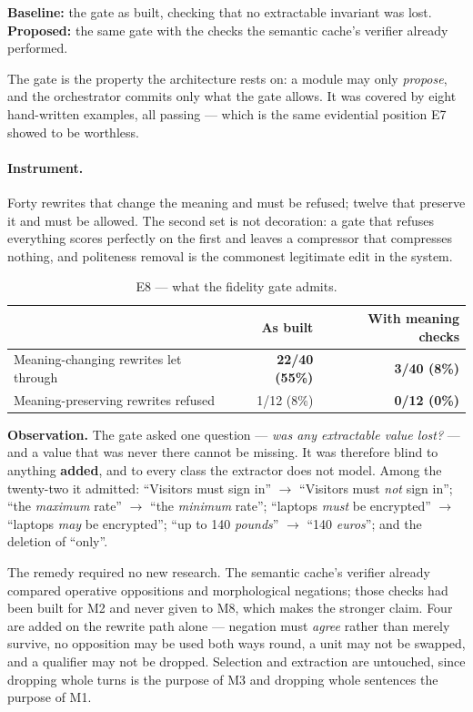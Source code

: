 \documentclass[11pt,a4paper]{article}
\newcommand{\obs}[1]{%
  \par\vspace{2pt}
  \noindent\begin{tcolorbox}[colback=soft,colframe=accent,boxrule=0pt,
    leftrule=2.2pt,arc=0pt,left=7pt,right=5pt,top=4pt,bottom=4pt,breakable]
  \small\textbf{Observation.} #1
  \end{tcolorbox}\par\vspace{2pt}}
\begin{document}
\textbf{Baseline:} the gate as built, checking that no extractable invariant was
lost. \textbf{Proposed:} the same gate with the checks the semantic cache's
verifier already performed.

The gate is the property the architecture rests on: a module may only
\emph{propose}, and the orchestrator commits only what the gate allows. It was
covered by eight hand-written examples, all passing --- which is the same
evidential position E7 showed to be worthless.

\paragraph{Instrument.} Forty rewrites that change the meaning and must be
refused; twelve that preserve it and must be allowed. The second set is not
decoration: a gate that refuses everything scores perfectly on the first and
leaves a compressor that compresses nothing, and politeness removal is the
commonest legitimate edit in the system.

\begin{table}[htbp]
\centering
\caption{E8 --- what the fidelity gate admits.}
\label{tab:gate}
\footnotesize
\begin{tabular}{@{}l r r@{}}
\toprule
 & \textbf{As built} & \textbf{With meaning checks} \\
\midrule
Meaning-changing rewrites let through & \textbf{22/40 (55\%)} & \textbf{3/40 (8\%)} \\
Meaning-preserving rewrites refused   & 1/12 (8\%)            & \textbf{0/12 (0\%)} \\
\bottomrule
\end{tabular}
\end{table}

\obs{The gate asked one question --- \emph{was any extractable value lost?} --- and
a value that was never there cannot be missing. It was therefore blind to
anything \textbf{added}, and to every class the extractor does not model. Among
the twenty-two it admitted: ``Visitors must sign in'' $\rightarrow$ ``Visitors
must \emph{not} sign in''; ``the \emph{maximum} rate'' $\rightarrow$ ``the
\emph{minimum} rate''; ``laptops \emph{must} be encrypted'' $\rightarrow$
``laptops \emph{may} be encrypted''; ``up to 140 \emph{pounds}'' $\rightarrow$
``140 \emph{euros}''; and the deletion of ``only''.}

The remedy required no new research. The semantic cache's verifier already
compared operative oppositions and morphological negations; those checks had
been built for M2 and never given to M8, which makes the stronger claim. Four
are added on the rewrite path alone --- negation must \emph{agree} rather than
merely survive, no opposition may be used both ways round, a unit may not be
swapped, and a qualifier may not be dropped. Selection and extraction are
untouched, since dropping whole turns is the purpose of M3 and dropping whole
sentences the purpose of M1.
\end{document}

